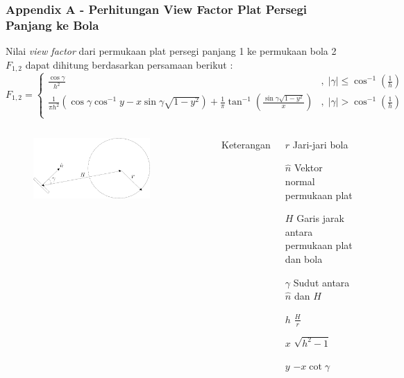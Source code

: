 \documentclass[8pt]{beamer}
\begin{document}
\begin{frame}
  \frametitle{Appendix A - Perhitungan View Factor Plat Persegi Panjang ke Bola}
  Nilai \textit{view factor} dari permukaan plat persegi panjang 1 ke permukaan
  bola 2 $F_{1,2}$ dapat dihitung berdasarkan persamaan berikut \cite{martinez2022a}:
\begin{equation}
	F_{1,2} = 
\begin{cases} 
	\frac{\cos{\gamma}}{h^2} & ,\;|\gamma| \leq \cos^{-1}\left(\frac{1}{h}\right) \\
	\frac{1}{\pi h^2} \left( \cos{\gamma}\cos^{-1}y - x\sin{\gamma}\sqrt{1-y^2} \right) + \frac{1}{\pi}\tan^{-1}\left( \frac{\sin{\gamma}\sqrt{1-y^2}}{x} \right) & ,\;|\gamma| > \cos^{-1}\left(\frac{1}{h}\right) \\
\end{cases}
\label{eq:vf}
\end{equation}

  \begin{columns}[T]
    \begin{figure}
      \includegraphics[width=0.8\textwidth]{figure/platball.png}
    \end{figure}
    \small
    \center Keterangan
    \begin{description}
      \item{$r$} Jari-jari bola
      \item{$\hat{n}$} Vektor normal permukaan plat
      \item{$H$} Garis jarak antara permukaan plat dan bola
      \item{$\gamma$} Sudut antara $\hat{n}$ dan $H$ 
      \item{$h$} $\frac{H}{r}$
      \item{$x$} $\sqrt{h^2 - 1}$
      \item{$y$} $-x \cot{\gamma}$
    \end{description}
  \end{columns}
\end{frame}
\end{document}
